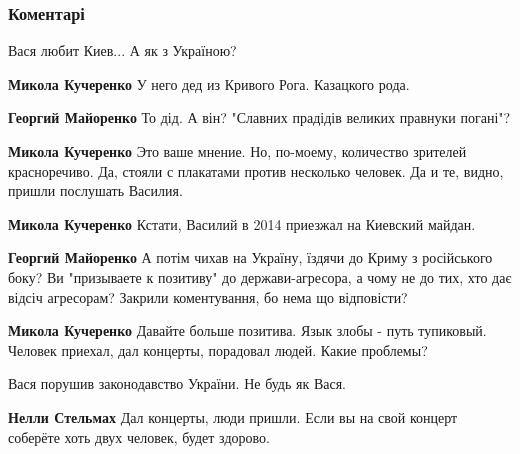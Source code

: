  
 
 
 
 
\subsubsection{Коментарі}
\label{sec:27_06_2021.fb.fb_group.story_kiev_ua.1.basta_repper_kiev.cmt}

\begin{itemize} %
Вася любит Киев... А як з Україною?

\begin{itemize} %
\textbf{Микола Кучеренко} У него дед из Кривого Рога. Казацкого рода.

\begin{itemize} %
\textbf{Георгий Майоренко} То дід. А він? "Славних прадідів великих правнуки погані"?

\textbf{Микола Кучеренко} Это ваше мнение. Но, по-моему, количество зрителей красноречиво. Да, стояли с плакатами против несколько человек. Да и те, видно, пришли послушать Василия.

\textbf{Микола Кучеренко} Кстати, Василий в 2014 приезжал на Киевский майдан.

\textbf{Георгий Майоренко} А потім чихав на Україну, їздячи до Криму з російського боку? Ви "призываете к позитиву" до держави-агресора, а чому не до тих, хто дає відсіч агресорам? Закрили коментування, бо нема що відповісти?

\textbf{Микола Кучеренко} Давайте больше позитива. Язык злобы - путь тупиковый. Человек приехал, дал концерты, порадовал людей. Какие проблемы?
\end{itemize} %

\end{itemize} %

Вася порушив законодавство України. Не будь як Вася.

\begin{itemize} %
\textbf{Нелли Стельмах} Дал концерты, люди пришли. Если вы на свой концерт соберёте хоть двух человек, будет здорово.


\end{itemize}
\end{itemize}

